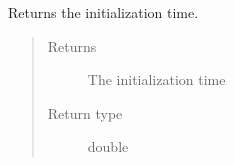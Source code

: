 \documentclass[letterpaper,10pt,english]{sphinxmanual}
\begin{document}

\begin{fulllineitems}
\label{doc:PythonGedLib.PyGetInitime}
Returns the initialization time.
\begin{quote}\begin{description}
\item[{Returns}] \leavevmode
The initialization time

\item[{Return type}] \leavevmode
double

\end{description}\end{quote}

\end{fulllineitems}

\end{document}

